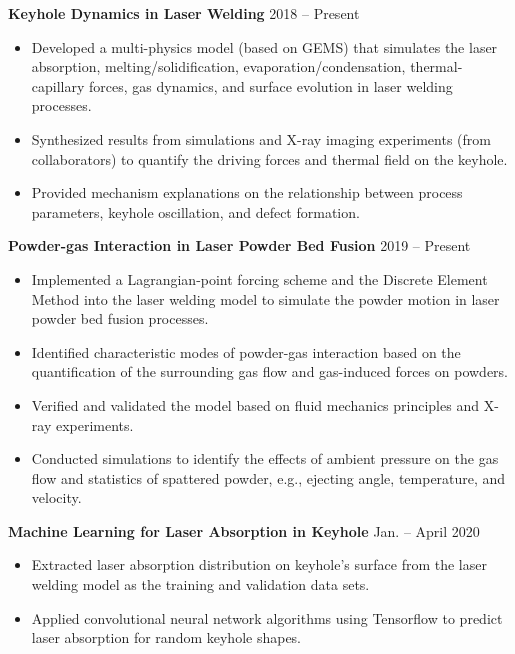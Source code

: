 \documentclass[11pt, letterpaper]{article}
\begin{document}
\textbf{Keyhole Dynamics in Laser Welding} \hfill 2018 -- Present
\begin{itemize}[leftmargin=*, labelsep=5mm]
   \item Developed a multi-physics model (based on GEMS) that simulates the laser absorption,
      melting/solidification, evaporation/condensation, thermal-capillary forces, gas dynamics, and
      surface evolution in laser welding processes.
   \item Synthesized results from simulations and X-ray imaging experiments (from collaborators) to
      quantify the driving forces and thermal field on the keyhole.
   \item Provided mechanism explanations on the relationship between process parameters, keyhole
      oscillation, and defect formation.
\end{itemize}

\vspace{3pt}
\textbf{Powder-gas Interaction in Laser Powder Bed Fusion} \hfill 2019 -- Present
\begin{itemize}[leftmargin=*, labelsep=5mm]
   \item Implemented a Lagrangian-point forcing scheme and the Discrete Element Method
      into the laser welding model to simulate the powder motion in laser powder bed fusion
      processes.
   \item Identified characteristic modes of powder-gas interaction based on the quantification of
      the surrounding gas flow and gas-induced forces on powders.
   \item Verified and validated the model based on fluid mechanics principles and X-ray experiments.
   \item Conducted simulations to identify the effects of ambient pressure on the gas flow and
      statistics of spattered powder, e.g., ejecting angle, temperature, and velocity.
\end{itemize}

\vspace{3pt}

\textbf{Machine Learning for Laser Absorption in Keyhole} \hfill Jan. -- April 2020
\begin{itemize}[leftmargin=*, labelsep=5mm]
   \item Extracted laser absorption distribution on keyhole's surface from the laser welding
      model as the training and validation data sets.
   \item Applied convolutional neural network algorithms using Tensorflow to predict laser
      absorption for random keyhole shapes.
\end{itemize}
\end{document}
